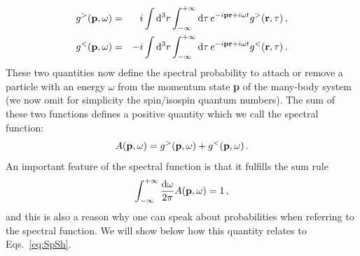 \begin{eqnarray}
\label{eq:FTpart}
g^>({\bf p},\omega) &=& i\int{\rm d}^3r\int_{-\infty}^{+\infty}{\rm d}\tau\,e^{-i{\bf pr}+i\omega t}g^>({\bf r},\tau)\,,\\
\label{eq:FThole}
g^<({\bf p},\omega) &=& -i\int{\rm d}^3r\int_{-\infty}^{+\infty}{\rm d}\tau\,e^{-i{\bf pr}+i\omega t}g^<({\bf r},\tau)\,.
\end{eqnarray}
These two quantities now define the spectral probability to attach or remove a particle with an energy $\omega$ from the momentum state {\bf p} of the many-body system (we now omit for simplicity the spin/isospin quantum numbers). The sum of these two functions defines a positive quantity which we call the spectral function:
\begin{equation}
\label{eq:spec_fun}
A({\bf p},\omega)=g^>({\bf p},\omega)+g^<({\bf p},\omega)\,.
\end{equation}
An important feature of the spectral function is that it fulfills the sum rule
\begin{equation}
\int_{-\infty}^{+\infty}\frac{{\rm d}\omega}{2\pi}A({\bf p},\omega)=1\,,
\end{equation} 
and this is also a reason why one can speak about probabilities when referring to the spectral function. We will show below how this quantity relates to Eqs.~\eqref{eq:SpSh}.

